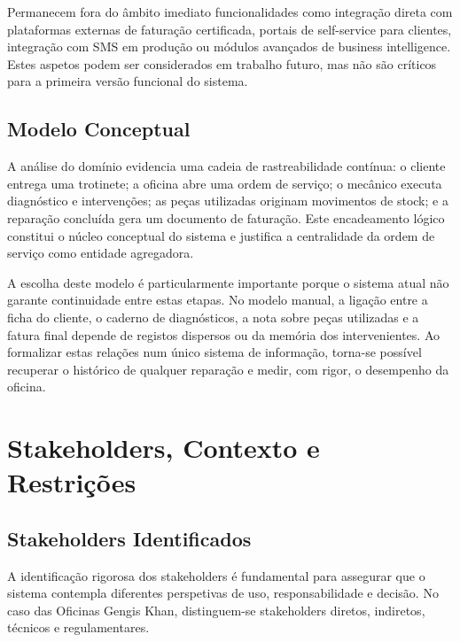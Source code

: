 \documentclass[a4paper,12pt]{scrreprt}
\begin{document}
        Permanecem fora do âmbito imediato funcionalidades como integração direta com plataformas externas de faturação certificada, portais de self-service para clientes, integração com SMS em produção ou módulos avançados de business intelligence. Estes aspetos podem ser considerados em trabalho futuro, mas não são críticos para a primeira versão funcional do sistema.

    \section{Modelo Conceptual}
        A análise do domínio evidencia uma cadeia de rastreabilidade contínua: o cliente entrega uma trotinete; a oficina abre uma ordem de serviço; o mecânico executa diagnóstico e intervenções; as peças utilizadas originam movimentos de stock; e a reparação concluída gera um documento de faturação. Este encadeamento lógico constitui o núcleo conceptual do sistema e justifica a centralidade da ordem de serviço como entidade agregadora.

        A escolha deste modelo é particularmente importante porque o sistema atual não garante continuidade entre estas etapas. No modelo manual, a ligação entre a ficha do cliente, o caderno de diagnósticos, a nota sobre peças utilizadas e a fatura final depende de registos dispersos ou da memória dos intervenientes. Ao formalizar estas relações num único sistema de informação, torna-se possível recuperar o histórico de qualquer reparação e medir, com rigor, o desempenho da oficina.

\chapter{Stakeholders, Contexto e Restrições}

    \section{Stakeholders Identificados}
        A identificação rigorosa dos stakeholders é fundamental para assegurar que o sistema contempla diferentes perspetivas de uso, responsabilidade e decisão. No caso das Oficinas Gengis Khan, distinguem-se stakeholders diretos, indiretos, técnicos e regulamentares.
\end{document}
